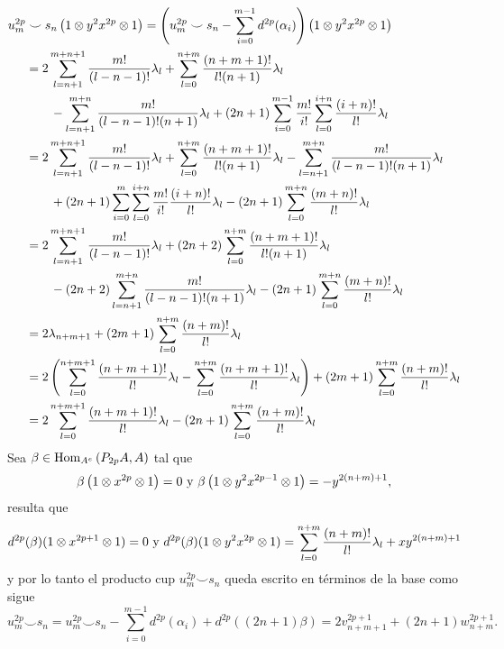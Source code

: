 \documentclass[fleqn,../tesis.tex]{subfiles}
\begin{document}
\begin{align*}
	u_m^{2p}& \smile s_n\left(1 \otimes y^2x^{2p} \otimes 1\right) =
		\left(u_m^{2p} \smile s_n - \sum_{i =0}^{m - 1}d^{2p}(\alpha_i)\right)
		\left(1 \otimes y^2x^{2p} \otimes 1\right)\\
	&=2\sum_{l = n + 1}^{m + n + 1}\frac{m!}{(l - n - 1)!}\lambda_l
		+\sum_{l = 0}^{n + m}\frac{(n + m + 1)!}{l!(n + 1)}\lambda_l\\
	&\qquad -\sum_{l = n + 1}^{m + n}\frac{m!}{(l - n - 1)!(n + 1)}\lambda_l
		+(2n + 1)\sum_{i = 0}^{m - 1}\frac{m!}{i!}\sum_{l = 0}^{i + n}\frac{(i + n)!}{l!}\lambda_l\\
	&= 2\sum_{l = n + 1}^{m + n + 1}\frac{m!}{(l - n - 1)!}\lambda_l
		+\sum_{l = 0}^{n + m}\frac{(n + m + 1)!}{l!(n + 1)}\lambda_l
	 	-\sum_{l = n + 1}^{m + n}\frac{m!}{(l - n - 1)!(n + 1)}\lambda_l\\
	&\qquad+(2n + 1)\sum_{i = 0}^{m}\sum_{l = 0}^{i + n}\frac{m!}{i!}\frac{(i + n)!}{l!}\lambda_l
		-(2n + 1)\sum_{l = 0}^{m + n}\frac{(m + n)!}{l!}\lambda_l\\
	&= 2\sum_{l = n + 1}^{m + n + 1}\frac{m!}{(l - n - 1)!}\lambda_l
		+(2n + 2)\sum_{l = 0}^{n + m}\frac{(n + m + 1)!}{l!(n + 1)}\lambda_l\\
	&\qquad -(2n + 2)\sum_{l = n + 1}^{m + n}\frac{m!}{(l - n - 1)!(n + 1)}\lambda_l
		-(2n + 1)\sum_{l = 0}^{m + n}\frac{(m + n)!}{l!}\lambda_l\\
	&= 2\lambda_{n + m + 1} + (2m + 1)\sum_{l = 0}^{n + m}\frac{(n + m)!}{l!}\lambda_l\\
	&= 2\left(\sum_{l = 0}^{n + m + 1}\frac{(n + m + 1)!}{l!} \lambda_l
		- \sum_{l = 0}^{n + m}\frac{(n + m + 1)!}{l!} \lambda_l\right)
		+ (2m + 1)\sum_{l = 0}^{n + m}\frac{(n + m)!}{l!}\lambda_l\\
	&= 	2\sum_{l = 0}^{n + m + 1}\frac{(n + m + 1)!}{l!} \lambda_l
		- (2n + 1)\sum_{l = 0}^{n + m}\frac{(n + m)!}{l!}\lambda_l
\end{align*}
Sea $\beta \in \operatorname{Hom}_{A^e}\left(P_{2p}A, A\right)$ tal que
\[
	\beta\left(1\otimes x^{2p} \otimes 1\right) = 0 \text{ y } \beta\left(1\otimes y^2x^{2p - 1} \otimes 1\right) = -y^{2(n + m)+ 1},
\]
resulta que
\[
	d^{2p}(\beta)(1\otimes x^{2p + 1} \otimes 1) =0 \text{ y }
		d^{2p}(\beta)(1\otimes y^2x^{2p} \otimes 1) = \sum_{l = 0}^{n + m}\frac{(n + m)!}{l!}\lambda_l + xy^{2(n + m) + 1}
\]
y por lo tanto el producto cup $u_m^{2p} \smile s_n$ queda escrito en términos de la base como sigue
\[
	u_m^{2p} \smile s_n = u_m^{2p} \smile s_n - \sum_{i =0}^{m - 1}d^{2p}(\alpha_i) + d^{2p}((2n + 1)\beta)
		= 2v_{n + m + 1}^{2p + 1} + (2n + 1)w_{n + m}^{2p + 1}.
\]
\end{document}
